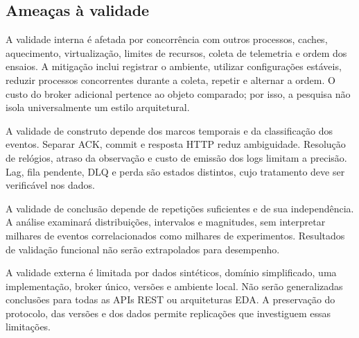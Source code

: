 \subsection{Ameaças à validade}
A validade interna é afetada por concorrência com outros processos, caches, aquecimento, virtualização, limites de recursos, coleta de telemetria e ordem dos ensaios. A mitigação inclui registrar o ambiente, utilizar configurações estáveis, reduzir processos concorrentes durante a coleta, repetir e alternar a ordem. O custo do broker adicional pertence ao objeto comparado; por isso, a pesquisa não isola universalmente um estilo arquitetural.

A validade de construto depende dos marcos temporais e da classificação dos eventos. Separar ACK, commit e resposta HTTP reduz ambiguidade. Resolução de relógios, atraso da observação e custo de emissão dos logs limitam a precisão. Lag, fila pendente, DLQ e perda são estados distintos, cujo tratamento deve ser verificável nos dados.

A validade de conclusão depende de repetições suficientes e de sua independência. A análise examinará distribuições, intervalos e magnitudes, sem interpretar milhares de eventos correlacionados como milhares de experimentos. Resultados de validação funcional não serão extrapolados para desempenho.

A validade externa é limitada por dados sintéticos, domínio simplificado, uma implementação, broker único, versões e ambiente local. Não serão generalizadas conclusões para todas as APIs REST ou arquiteturas EDA. A preservação do protocolo, das versões e dos dados permite replicações que investiguem essas limitações.
